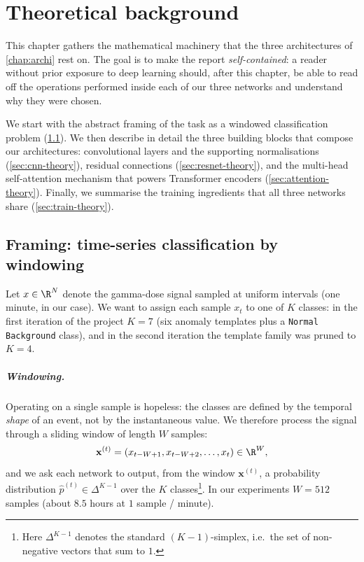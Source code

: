 \chapter{Theoretical background}
\label{chap:theory}

This chapter gathers the mathematical machinery that the three
architectures of \cref{chap:archi} rest on. The goal is to make the
report \emph{self-contained}: a reader without prior exposure to
deep learning should, after this chapter, be able to read off the
operations performed inside each of our three networks and understand
why they were chosen.

We start with the abstract framing of the task as a windowed
classification problem (\cref{sec:framing}). We then describe in detail
the three building blocks that compose our architectures:
convolutional layers and the supporting normalisations
(\cref{sec:cnn-theory}), residual connections (\cref{sec:resnet-theory}),
and the multi-head self-attention mechanism that powers Transformer
encoders (\cref{sec:attention-theory}). Finally, we summarise the
training ingredients that all three networks share
(\cref{sec:train-theory}).

\section{Framing: time-series classification by windowing}
\label{sec:framing}

Let $x \in \R^N$ denote the gamma-dose signal sampled at uniform
intervals (one minute, in our case). We want to assign each sample
$x_t$ to one of $K$ classes: in the first iteration of the project
$K = 7$ (six anomaly templates plus a \texttt{Normal Background}
class), and in the second iteration the template family was pruned
to $K = 4$.

\paragraph{Windowing.} Operating on a single sample is hopeless: the
classes are defined by the temporal \emph{shape} of an event, not by
the instantaneous value. We therefore process the signal through a
sliding window of length $W$ samples:
\begin{equation}
    \mathbf{x}^{(t)} = (x_{t-W+1}, x_{t-W+2}, \dots, x_t) \in \R^W,
    \label{eq:window}
\end{equation}
and we ask each network to output, from the window $\mathbf{x}^{(t)}$,
a probability distribution
$\hat{p}^{(t)} \in \Delta^{K-1}$ over the $K$ classes\footnote{Here
$\Delta^{K-1}$ denotes the standard $(K-1)$-simplex, i.e.\ the set of
non-negative vectors that sum to $1$.}. In our experiments $W=512$
samples (about $8.5$ hours at $1$ sample / minute).

